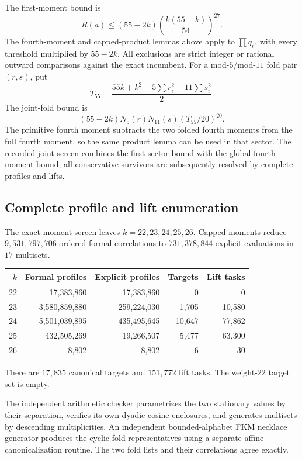 \documentclass[11pt,a4paper]{article}
\theoremstyle{remark}
\begin{document}
The first-moment bound is
\[
 R(a)\le(55-2k)\left(\frac{k(55-k)}{54}\right)^{27}.
\]
The fourth-moment and capped-product lemmas above apply to $\prod q_r$,
with every threshold multiplied by $55-2k$. All exclusions are strict
integer or rational outward comparisons against the exact incumbent.
For a mod-$5$/mod-$11$ fold pair $(r,s)$, put
\[
 T_{55}=\frac{55k+k^2-5\sum r_i^2-11\sum s_i^2}{2}.
\]
The joint-fold bound is
\[
 (55-2k)N_5(r)N_{11}(s)(T_{55}/20)^{20}.
\]
The primitive fourth moment subtracts the two folded fourth moments
from the full fourth moment, so the same product lemma can be used
in that sector. The recorded joint screen combines the first-sector
bound with the global fourth-moment bound; all conservative survivors
are subsequently resolved by complete profiles and lifts.


\subsection{Complete profile and lift enumeration}

The exact moment screen leaves $k=22,23,24,25,26$. Capped moments
reduce $9,531,797,706$ ordered formal correlations to $731,378,844$
explicit evaluations in $17$ multisets.
\begin{center}
\small
\begin{tabular}{@{}rrrrr@{}}
\toprule
$k$ & Formal profiles & Explicit profiles & Targets & Lift tasks\\
\midrule
22 & 17,383,860 & 17,383,860 & 0 & 0\\
23 & 3,580,859,880 & 259,224,030 & 1,705 & 10,580\\
24 & 5,501,039,895 & 435,495,645 & 10,647 & 77,862\\
25 & 432,505,269 & 19,266,507 & 5,477 & 63,300\\
26 & 8,802 & 8,802 & 6 & 30\\
\bottomrule
\end{tabular}
\end{center}
There are $17,835$ canonical targets and $151,772$ lift tasks.
The weight-$22$ target set is empty.

The independent arithmetic checker parametrizes the two stationary
values by their separation, verifies its own dyadic cosine enclosures,
and generates multisets by descending multiplicities.
An independent bounded-alphabet FKM necklace generator produces
the cyclic fold representatives using a separate affine
canonicalization routine. The two fold lists and their
correlations agree exactly.
\end{document}
